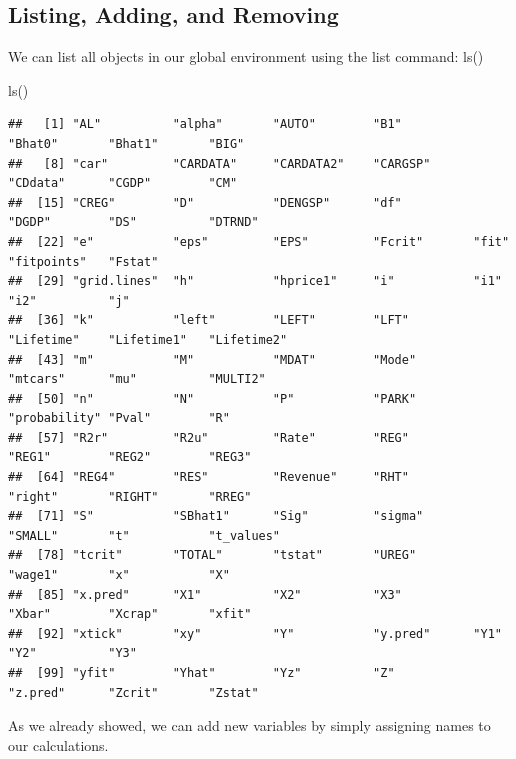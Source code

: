 \documentclass[
]{book}
\newenvironment{Shaded}{\begin{snugshade}}{\end{snugshade}}
\newcommand{\FunctionTok}[1]{\textcolor[rgb]{0.00,0.00,0.00}{#1}}
\newcommand{\NormalTok}[1]{#1}
\begin{document}
\hypertarget{listing-adding-and-removing}{%
\subsection{Listing, Adding, and Removing}\label{listing-adding-and-removing}}

We can list all objects in our global environment using the list command: ls()

\begin{Shaded}
\begin{Highlighting}[]
\FunctionTok{ls}\NormalTok{()}
\end{Highlighting}
\end{Shaded}

\begin{verbatim}
##   [1] "AL"          "alpha"       "AUTO"        "B1"          "Bhat0"       "Bhat1"       "BIG"        
##   [8] "car"         "CARDATA"     "CARDATA2"    "CARGSP"      "CDdata"      "CGDP"        "CM"         
##  [15] "CREG"        "D"           "DENGSP"      "df"          "DGDP"        "DS"          "DTRND"      
##  [22] "e"           "eps"         "EPS"         "Fcrit"       "fit"         "fitpoints"   "Fstat"      
##  [29] "grid.lines"  "h"           "hprice1"     "i"           "i1"          "i2"          "j"          
##  [36] "k"           "left"        "LEFT"        "LFT"         "Lifetime"    "Lifetime1"   "Lifetime2"  
##  [43] "m"           "M"           "MDAT"        "Mode"        "mtcars"      "mu"          "MULTI2"     
##  [50] "n"           "N"           "P"           "PARK"        "probability" "Pval"        "R"          
##  [57] "R2r"         "R2u"         "Rate"        "REG"         "REG1"        "REG2"        "REG3"       
##  [64] "REG4"        "RES"         "Revenue"     "RHT"         "right"       "RIGHT"       "RREG"       
##  [71] "S"           "SBhat1"      "Sig"         "sigma"       "SMALL"       "t"           "t_values"   
##  [78] "tcrit"       "TOTAL"       "tstat"       "UREG"        "wage1"       "x"           "X"          
##  [85] "x.pred"      "X1"          "X2"          "X3"          "Xbar"        "Xcrap"       "xfit"       
##  [92] "xtick"       "xy"          "Y"           "y.pred"      "Y1"          "Y2"          "Y3"         
##  [99] "yfit"        "Yhat"        "Yz"          "Z"           "z.pred"      "Zcrit"       "Zstat"
\end{verbatim}

As we already showed, we can add new variables by simply assigning names to our calculations.
\end{document}
